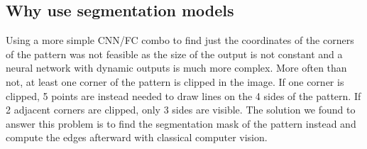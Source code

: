 \subsection{Why use segmentation models}

Using a more simple CNN/FC combo to find just the coordinates of the corners of the pattern was not feasible as the size of the output is not
constant and a neural network with dynamic outputs is much more complex. More often than not, at least one corner of the pattern is
clipped in the image. If one corner is clipped, 5 points are instead needed to draw lines on the 4 sides of the pattern. If 2 adjacent corners
are clipped, only 3 sides are visible. The solution we found to answer this problem is to find the segmentation mask of the pattern
instead and compute the edges afterward with classical computer vision. 
